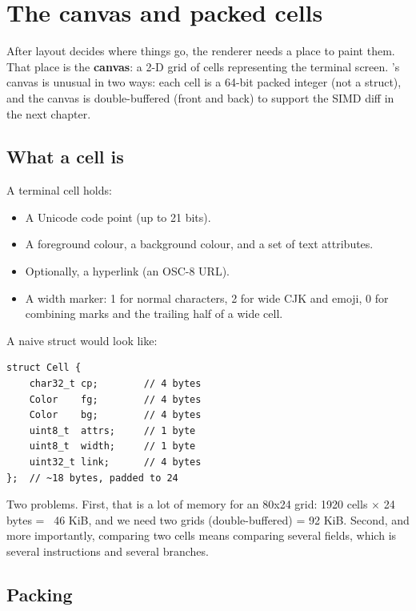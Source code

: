 \chapter{The canvas and packed cells}
\label{ch:canvas}

After layout decides where things go, the renderer needs a place to
paint them. That place is the \textbf{canvas}: a 2-D grid of cells
representing the terminal screen. \maya{}'s canvas is unusual in two
ways: each cell is a 64-bit packed integer (not a struct), and the
canvas is double-buffered (front and back) to support the SIMD diff
in the next chapter.

\section{What a cell is}

A terminal cell holds:

\begin{itemize}[leftmargin=*]
  \item A Unicode code point (up to 21 bits).
  \item A foreground colour, a background colour, and a set of text
    attributes.
  \item Optionally, a hyperlink (an OSC-8 URL).
  \item A width marker: 1 for normal characters, 2 for wide CJK and
    emoji, 0 for combining marks and the trailing half of a wide
    cell.
\end{itemize}

A naive struct would look like:

\begin{lstlisting}
struct Cell {
    char32_t cp;        // 4 bytes
    Color    fg;        // 4 bytes
    Color    bg;        // 4 bytes
    uint8_t  attrs;     // 1 byte
    uint8_t  width;     // 1 byte
    uint32_t link;      // 4 bytes
};  // ~18 bytes, padded to 24
\end{lstlisting}

Two problems. First, that is a lot of memory for an 80x24 grid: 1920
cells $\times$ 24 bytes = ~46 KiB, and we need two grids
(double-buffered) = 92 KiB. Second, and more importantly, comparing
two cells means comparing several fields, which is several
instructions and several branches.

\section{Packing}

